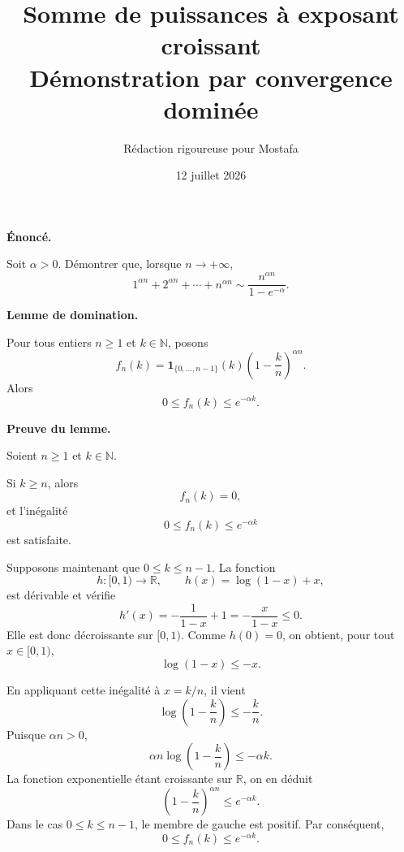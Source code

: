 \documentclass[11pt,a4paper]{article}
\title{
  \textbf{Somme de puissances \`a exposant croissant}\\
  \large D\'emonstration par convergence domin\'ee
}
\author{R\'edaction rigoureuse pour Mostafa}
\date{12 juillet 2026}
\newcommand{\N}{\mathbb{N}}
\newcommand{\R}{\mathbb{R}}
\newcommand{\1}{\mathbf{1}}
\begin{document}
\maketitle

\begin{theoremebox}
\textbf{\'Enonc\'e.}

Soit \(\alpha>0\). D\'emontrer que, lorsque
\(n\longrightarrow+\infty\),
\[
1^{\alpha n}+2^{\alpha n}+\cdots+n^{\alpha n}
\sim
\frac{n^{\alpha n}}{1-e^{-\alpha}}.
\]
\end{theoremebox}

\begin{lemmebox}
\textbf{Lemme de domination.}

Pour tous entiers \(n\geq 1\) et \(k\in\N\), posons
\[
f_n(k)
=
\1_{\{0,\ldots,n-1\}}(k)
\left(1-\frac{k}{n}\right)^{\alpha n}.
\]
Alors
\[
0\leq f_n(k)\leq e^{-\alpha k}.
\]
\end{lemmebox}

\begin{preuvebox}
\textbf{Preuve du lemme.}

Soient \(n\geq1\) et \(k\in\N\).

Si \(k\geq n\), alors
\[
f_n(k)=0,
\]
et l'in\'egalit\'e
\[
0\leq f_n(k)\leq e^{-\alpha k}
\]
est satisfaite.

Supposons maintenant que \(0\leq k\leq n-1\). La fonction
\[
h:[0,1)\longrightarrow\R,
\qquad
h(x)=\log(1-x)+x,
\]
est d\'erivable et v\'erifie
\[
h'(x)
=
-\frac{1}{1-x}+1
=
-\frac{x}{1-x}
\leq 0.
\]
Elle est donc d\'ecroissante sur \([0,1)\). Comme \(h(0)=0\),
on obtient, pour tout \(x\in[0,1)\),
\[
\log(1-x)\leq -x.
\]

En appliquant cette in\'egalit\'e \`a \(x=k/n\), il vient
\[
\log\left(1-\frac{k}{n}\right)
\leq
-\frac{k}{n}.
\]
Puisque \(\alpha n>0\),
\[
\alpha n
\log\left(1-\frac{k}{n}\right)
\leq
-\alpha k.
\]
La fonction exponentielle \'etant croissante sur \(\R\), on en
d\'eduit
\[
\left(1-\frac{k}{n}\right)^{\alpha n}
\leq e^{-\alpha k}.
\]
Dans le cas \(0\leq k\leq n-1\), le membre de gauche est
positif. Par cons\'equent,
\[
0\leq f_n(k)\leq e^{-\alpha k}.
\]
\end{preuvebox}
\end{document}
